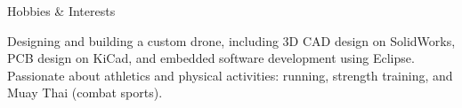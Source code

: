 \documentclass[10pt]{style}
\begin{document}

\begin{rSection}{Hobbies \& Interests}

    Designing and building a custom drone, including 3D CAD design on SolidWorks, PCB design on KiCad, and embedded software development using Eclipse. \\
    Passionate about athletics and physical activities: running, strength training, and Muay Thai (combat sports).

\end{rSection}
\end{document}
